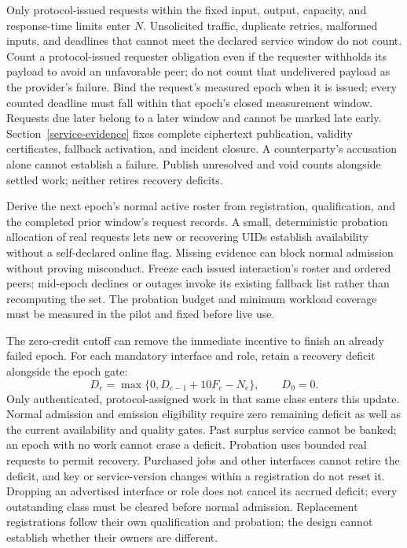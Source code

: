 Only protocol-issued requests within the fixed input, output, capacity,
and response-time limits enter \(N\). Unsolicited traffic, duplicate
retries, malformed inputs, and deadlines that cannot meet the declared
service window do not count. Count a protocol-issued requester obligation
even if the requester withholds its payload to avoid an unfavorable
peer; do not count that undelivered payload as the provider's failure.
Bind the request's measured epoch when it
is issued; every counted deadline must fall within that epoch's closed
measurement window. Requests due later belong to a later window and
cannot be marked late early. Section~\ref{service-evidence} fixes complete
ciphertext publication, validity certificates, fallback activation, and
incident closure. A counterparty's accusation alone cannot establish a
failure. Publish unresolved and void counts alongside settled work;
neither retires recovery deficits.

Derive the next epoch's normal active roster from registration,
qualification, and the completed prior window's request records. A
small, deterministic probation allocation of real requests lets new or
recovering UIDs establish availability without a self-declared online
flag. Missing evidence can block normal admission without proving
misconduct. Freeze each issued interaction's roster and ordered peers;
mid-epoch declines or outages invoke its existing fallback list rather
than recomputing the set. The probation budget and minimum workload
coverage must be measured in the pilot and fixed before live use.

The zero-credit cutoff can remove the immediate incentive to finish an
already failed epoch. For each mandatory interface and role, retain a
recovery deficit alongside the epoch gate:
\begin{equation}\label{eq:recovery-deficit}
 D_e=\max\{0,D_{e-1}+10F_e-N_e\},\qquad D_0=0.
\end{equation}
Only authenticated, protocol-assigned work in that same class enters
this update. Normal admission and emission eligibility require zero
remaining deficit as well as the current availability and quality gates.
Past surplus service cannot be banked; an epoch with no work cannot
erase a deficit. Probation uses bounded real requests to permit recovery.
Purchased jobs and other interfaces cannot retire the deficit, and key
or service-version changes within a registration do not reset it.
Dropping an advertised interface or role does not cancel its accrued
deficit; every outstanding class must be cleared before normal admission.
Replacement registrations follow their own qualification and probation;
the design cannot establish whether their owners are different.

